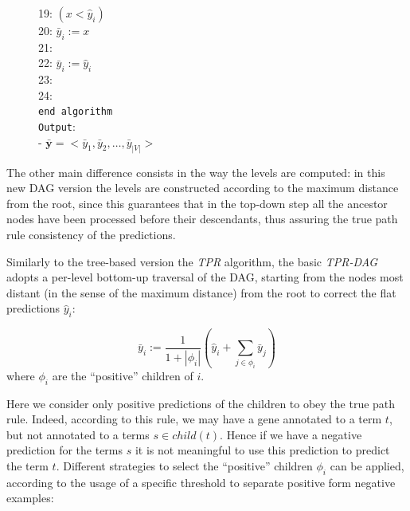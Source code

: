 \documentclass{bioinfo}
\newcommand{\indb}{\phantom{1}\hspace{8.5mm}}
\newcommand{\indc}{\phantom{1}\hspace{12mm}}
\newcommand{\indd}{\phantom{1}\hspace{16mm}}
\newcommand{\inde}{\phantom{1}\hspace{20mm}}
\newcommand{\by}{\boldsymbol{y}}
\begin{document}
\begin{methods}
\begin{figure}[!h]
\begin{center}
{\begin{minipage}{0.40\textwidth}
19:          \indd  {\tt if} $(x < \hat{y}_i)$\\
20:             \inde  $\bar{y}_i := x$\\
21:          \indd  {\tt else}\\
22:             \inde  $\bar{y}_i := \hat{y}_i$\\
23:      \indc  {\tt end for}\\
24:    \indb {\tt end for}\\
{\tt end algorithm}\\
\noindent
{\tt Output}:\\
- $\bar{\by} = < \bar{y}_1, \bar{y}_2, \ldots, \bar{y}_{|V|}>$\\
\end{minipage}
}
\end{center}
\end{figure}


The other main difference consists in the way the levels are computed: in this new DAG version the levels are constructed according to the maximum distance from the root, since this guarantees that in the top-down step all the ancestor nodes have been processed before their descendants, thus assuring the true path rule consistency of the predictions. 


Similarly to the tree-based version the {\em TPR} algorithm, the basic {\em TPR-DAG} adopts a per-level bottom-up traversal of the DAG, starting from the nodes most distant (in the sense of the maximum distance) from the root to correct the flat predictions $\hat{y}_i$:

\begin{equation}  
\bar{y}_i := \frac{1}{1 + |\phi_i|} (\hat{y}_i + \sum_{j \in \phi_i} \bar{y}_j)
\label{eq:TPR}
\end{equation}
where $\phi_i$ are the ``positive'' children of $i$.

Here we consider only positive predictions of the children to obey the true path rule. Indeed, according to this rule, we may have a gene annotated to a term $t$, but not annotated to a terms $s \in child(t)$. Hence if we have a negative prediction for the terms $s$ it is not meaningful to use this prediction to predict the term $t$.
Different strategies to select the  ``positive'' children $\phi_i$ can be applied, according to the usage of a specific threshold to separate positive form negative examples:


\end{methods}
\end{document}
